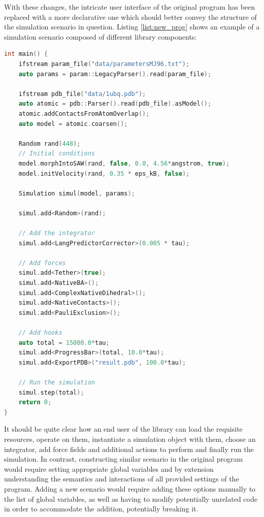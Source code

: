 With these changes, the intricate user interface of the original program has been replaced with a more declarative one which should better convey the structure of the simulation scenario in question. Listing \ref{list:new_prog} shows an example of a simulation scenario composed of different library components:

\begin{lstlisting}[language=C++,caption=Example scenario that simulates an ordered protein]
int main() {
    ifstream param_file("data/parametersMJ96.txt");
    auto params = param::LegacyParser().read(param_file);
    
    ifstream pdb_file("data/1ubq.pdb");
    auto atomic = pdb::Parser().read(pdb_file).asModel();
    atomic.addContactsFromAtomOverlap();
    auto model = atomic.coarsen();

    Random rand(448);
    // Initial conditions
    model.morphIntoSAW(rand, false, 0.0, 4.56*angstrom, true);
    model.initVelocity(rand, 0.35 * eps_kB, false);

    Simulation simul(model, params);

    simul.add<Random>(rand);
    
    // Add the integrator 
    simul.add<LangPredictorCorrector>(0.005 * tau);

    // Add forces
    simul.add<Tether>(true);
    simul.add<NativeBA>();
    simul.add<ComplexNativeDihedral>();
    simul.add<NativeContacts>();
    simul.add<PauliExclusion>();

    // Add hooks
    auto total = 15000.0*tau;
    simul.add<ProgressBar>(total, 10.0*tau);
    simul.add<ExportPDB>("result.pdb", 100.0*tau);

    // Run the simulation
    simul.step(total);
    return 0;
}
\end{lstlisting}\label{list:new_prog}


It should be quite clear how an end user of the library can load the requisite resources, operate on them, instantiate a simulation object with them, choose an integrator, add force fields and additional actions to perform and finally run the simulation. In contrast, constructing similar scenario in the original program would require setting appropriate global variables and by extension understanding the semantics and interactions of all provided settings of the program. Adding a new scenario would require adding these options manually to the list of global variables, as well as having to modify potentially unrelated code in order to accommodate the addition, potentially breaking it.

